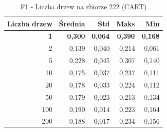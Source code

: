 \begin{table}[htbp]
\centering
\small
\setlength{\tabcolsep}{6pt}
\renewcommand{\arraystretch}{1.2}
\caption{F1 - Liczba drzew na zbiorze 222 (CART)}
\label{tab:CART_tree_count_222_f1}
\begin{tabular}{r|r|r|r|r}
\toprule
Liczba drzew & Średnia & Std & Maks & Min \\
\hline
\textbf{1} & \textbf{0,300} & \textbf{0,064} & \textbf{0,390} & \textbf{0,168} \\
2 & 0,139 & 0,040 & 0,214 & 0,061 \\
5 & 0,228 & 0,045 & 0,307 & 0,140 \\
10 & 0,175 & 0,037 & 0,237 & 0,111 \\
20 & 0,178 & 0,033 & 0,224 & 0,112 \\
50 & 0,179 & 0,023 & 0,213 & 0,134 \\
100 & 0,190 & 0,014 & 0,223 & 0,164 \\
200 & 0,188 & 0,017 & 0,234 & 0,156 \\
\bottomrule
\end{tabular}
\end{table}